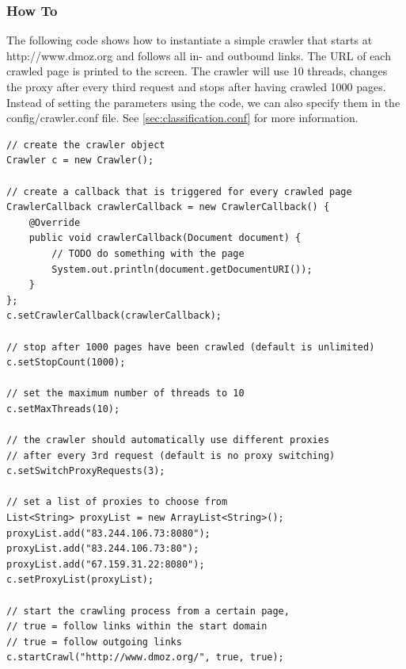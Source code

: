 \documentclass[a4paper,twoside]{article}      %
\begin{document}
\subsubsection{How To}
The following code shows how to instantiate a simple crawler that starts at http://www.dmoz.org and follows all in- and outbound links. The URL of each crawled page is printed to the screen. The crawler will use 10 threads, changes the proxy after every third request and stops after having crawled 1000 pages. Instead of setting the parameters using the code, we can also specify them in the config/crawler.conf file. See \ref{sec:classification.conf} for more information.

\begin{codelisting}
\begin{lstlisting}[frame=tb]
// create the crawler object
Crawler c = new Crawler();

// create a callback that is triggered for every crawled page
CrawlerCallback crawlerCallback = new CrawlerCallback() {
	@Override
	public void crawlerCallback(Document document) {
		// TODO do something with the page
		System.out.println(document.getDocumentURI());
	}
};
c.setCrawlerCallback(crawlerCallback);

// stop after 1000 pages have been crawled (default is unlimited)
c.setStopCount(1000);

// set the maximum number of threads to 10
c.setMaxThreads(10);

// the crawler should automatically use different proxies
// after every 3rd request (default is no proxy switching)
c.setSwitchProxyRequests(3);

// set a list of proxies to choose from
List<String> proxyList = new ArrayList<String>();
proxyList.add("83.244.106.73:8080");
proxyList.add("83.244.106.73:80");
proxyList.add("67.159.31.22:8080");
c.setProxyList(proxyList);

// start the crawling process from a certain page,
// true = follow links within the start domain
// true = follow outgoing links
c.startCrawl("http://www.dmoz.org/", true, true);
\end{lstlisting}
\end{codelisting}
\end{document}
